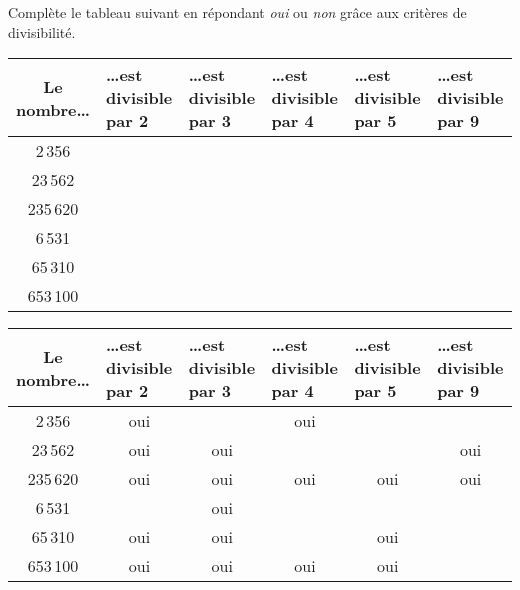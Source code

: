 Complète le tableau suivant en répondant {\em oui} ou {\em non} grâce
aux critères de divisibilité.
\begin{center}
  \begin{tabular}{|c|m{2cm}|m{2cm}|m{2cm}|m{2cm}|m{2cm}|}
    \hline
Le nombre\ldots&\ldots est divisible par 2&\ldots est divisible par
3&\ldots est divisible par 4&\ldots est divisible par 5&\ldots est
divisible par 9\\
\hline
2\,356&&&&&\\
\hline
23\,562&&&&&\\
\hline
235\,620&&&&&\\
\hline
6\,531&&&&&\\
\hline
65\,310&&&&&\\
\hline
653\,100&&&&&\\
\hline
  \end{tabular}
\end{center}
\begin{center}
  \begin{tabular}{|c|m{2cm}|m{2cm}|m{2cm}|m{2cm}|m{2cm}|}
    \hline
Le nombre\ldots&\ldots est divisible par 2&\ldots est divisible par
3&\ldots est divisible par 4&\ldots est divisible par 5&\ldots est
divisible par 9\\
\hline
2\,356&\multicolumn{1}{c|}{oui}&&\multicolumn{1}{c|}{oui}&&\\
\hline
23\,562&\multicolumn{1}{c|}{oui}&\multicolumn{1}{c|}{oui}&&&\multicolumn{1}{c|}{oui}\\
\hline
235\,620&\multicolumn{1}{c|}{oui}&\multicolumn{1}{c|}{oui}&\multicolumn{1}{c|}{oui}&\multicolumn{1}{c|}{oui}&\multicolumn{1}{c|}{oui}\\
\hline
6\,531&&\multicolumn{1}{c|}{oui}&&&\\
\hline
65\,310&\multicolumn{1}{c|}{oui}&\multicolumn{1}{c|}{oui}&&\multicolumn{1}{c|}{oui}&\\
\hline
653\,100&\multicolumn{1}{c|}{oui}&\multicolumn{1}{c|}{oui}&\multicolumn{1}{c|}{oui}&\multicolumn{1}{c|}{oui}&\\
\hline
  \end{tabular}
\end{center}